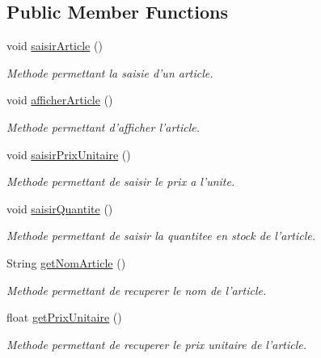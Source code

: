\subsection*{Public Member Functions}
\begin{DoxyCompactItemize}
\item 
void \hyperlink{classgestion_commande_1_1_article_a9cbf8063f8e987a49d420ada8232cdfd}{saisir\-Article} ()
\begin{DoxyCompactList}\small\item\em Methode permettant la saisie d'un article. \end{DoxyCompactList}\item 
void \hyperlink{classgestion_commande_1_1_article_a3a5a28348928a6b88b337f46a88026e1}{afficher\-Article} ()
\begin{DoxyCompactList}\small\item\em Methode permettant d'afficher l'article. \end{DoxyCompactList}\item 
void \hyperlink{classgestion_commande_1_1_article_aba22b733dd82931721613a0e4338ab9f}{saisir\-Prix\-Unitaire} ()
\begin{DoxyCompactList}\small\item\em Methode permettant de saisir le prix a l'unite. \end{DoxyCompactList}\item 
void \hyperlink{classgestion_commande_1_1_article_a51ce07f2587d767cf8d88bdd5fcbcf4f}{saisir\-Quantite} ()
\begin{DoxyCompactList}\small\item\em Methode permettant de saisir la quantitee en stock de l'article. \end{DoxyCompactList}\item 
String \hyperlink{classgestion_commande_1_1_article_a6206b8fb5eb14b54eefb9cd48ed50ac1}{get\-Nom\-Article} ()
\begin{DoxyCompactList}\small\item\em Methode permettant de recuperer le nom de l'article. \end{DoxyCompactList}\item 
float \hyperlink{classgestion_commande_1_1_article_a67b9ca3be955dd04c9aa3707b65b43c7}{get\-Prix\-Unitaire} ()
\begin{DoxyCompactList}\small\item\em Methode permettant de recuperer le prix unitaire de l'article. \end{DoxyCompactList}\item 

\end{DoxyCompactItemize}
